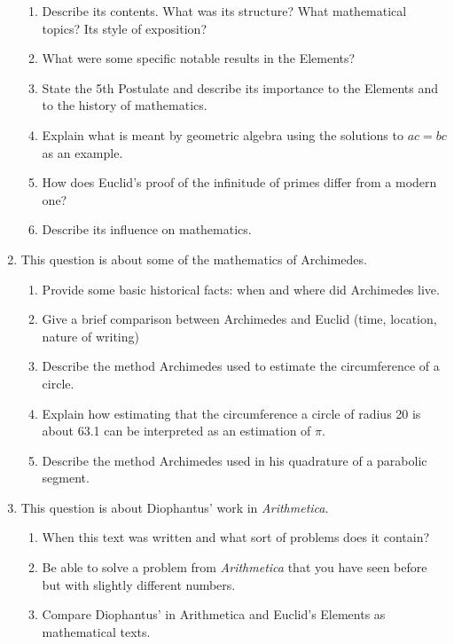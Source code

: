 \documentclass[12pt]{article}
\begin{document}
\begin{enumerate}
\begin{enumerate}
	\item Describe its contents. What was its structure? What mathematical topics? Its style of exposition?
	\item What were some specific notable results in the Elements?
	\item State the 5th Postulate and describe its importance to the Elements and to the history of mathematics.
	\item Explain what is meant by geometric algebra using the solutions to $ac=bc$ as an example.
	\item How does Euclid's proof of the infinitude of primes differ from a modern one?
	\item Describe its influence on mathematics.
	\end{enumerate}
\item This question is about some of the mathematics of Archimedes.
	\begin{enumerate}
	\item Provide some basic historical facts: when and where did Archimedes live.
	\item Give a brief comparison between Archimedes and Euclid (time, location, nature of writing)
	\item Describe the method Archimedes used to estimate the circumference of a circle.
	\item Explain how estimating that the circumference a circle of radius 20 is about 63.1 can be interpreted as an estimation of $\pi$.
	\item Describe the method Archimedes used in his quadrature of a parabolic segment.
	\end{enumerate}
\item This question is about Diophantus' work in \textit{Arithmetica}.
	\begin{enumerate}
	\item When this text was written and what sort of problems does it contain?
	\item Be able to solve a problem from \textit{Arithmetica}  that you have seen before but with slightly different numbers. 
	\item Compare Diophantus' in Arithmetica and Euclid's Elements as mathematical texts. 
	\end{enumerate} 
\end{enumerate}
\end{document}
